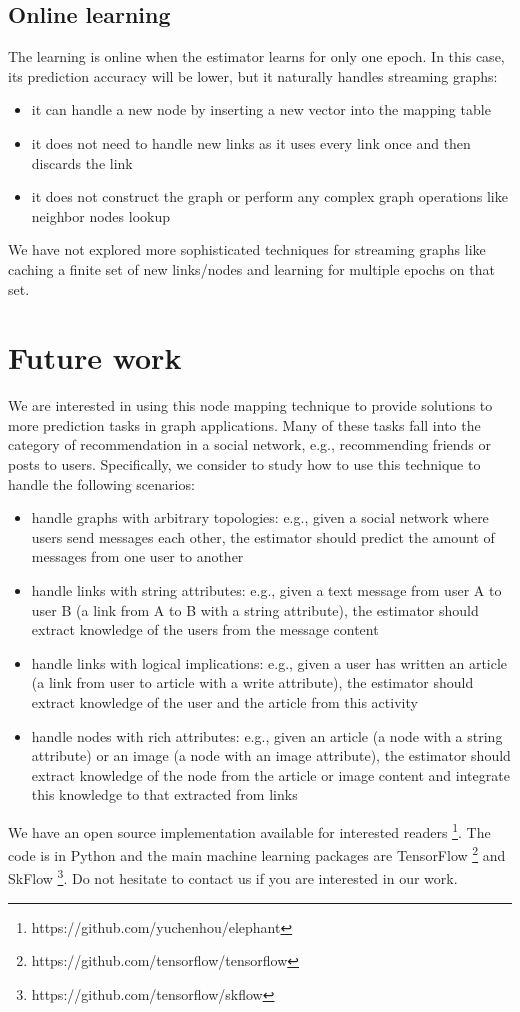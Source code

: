 \documentclass[twocolumn]{article}
\begin{document}
\subsection{Online learning}
The learning is online when the estimator learns for only one epoch. In 
this case, its prediction accuracy will be lower, but it naturally handles 
streaming graphs:
\begin{itemize}
	\item it can handle a new node by inserting a new vector into the mapping 
	table
	\item it does not need to handle new links as it uses every link once and 
	then discards the link
	\item it does not construct the graph or perform any complex graph 
	operations like neighbor nodes lookup
\end{itemize}
We have not explored more sophisticated techniques for streaming graphs like 
caching a finite set of new links/nodes and learning for multiple epochs on 
that set.

\section{Future work}
We are interested in using this node mapping technique to provide solutions to 
more prediction tasks in graph applications. Many of these tasks fall into the 
category of recommendation in a social network, e.g., recommending friends or 
posts to users.
Specifically, we consider to study how to use this technique to handle the 
following scenarios:
\begin{itemize}
	\item handle graphs with arbitrary topologies: e.g., given a social 
	network where users send messages each other, the estimator should 
	predict the amount of messages from one user to another
	\item handle links with string attributes: e.g., given a text message from 
	user A to user B (a link from A to B with a string attribute), the 
	estimator should extract knowledge of the users from the message content
	\item handle links with logical implications: e.g., given a user has 
	written an article (a link from user to article with a write attribute), 
	the estimator should extract knowledge of the user and the article from 
	this activity
	\item handle nodes with rich attributes: e.g., given an article (a node 
	with a string attribute) or an image (a node with an image attribute), the 
	estimator should extract knowledge of the node from the article or image 
	content and integrate this knowledge to that extracted from links
\end{itemize}
We have an open source implementation available for interested readers  
\footnote{https://github.com/yuchenhou/elephant}.
The code is in Python and the main machine learning packages are TensorFlow 
\cite{abadi2016tensorflow} \footnote{https://github.com/tensorflow/tensorflow} 
and SkFlow \footnote{https://github.com/tensorflow/skflow}.
Do not hesitate to contact us if you are interested in our work.
\end{document}
